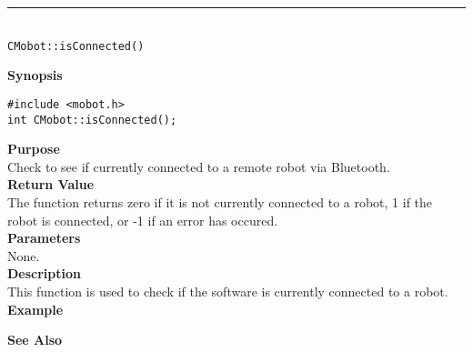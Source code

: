 \noindent
\vspace{5pt}
\rule{4.5in}{0.015in}\\
\noindent
{\LARGE \texttt{CMobot::isConnected()}}\\
{}

\noindent
{\bf Synopsis}
\begin{verbatim}
#include <mobot.h>
int CMobot::isConnected();
\end{verbatim}

\noindent
{\bf Purpose}\\
Check to see if currently connected to a remote robot via Bluetooth.\\

\noindent
{\bf Return Value}\\
The function returns zero if it is not currently connected to a robot, 1 if the robot 
is connected, or -1 if an error has occured.\\

\noindent
{\bf Parameters}\\
None.\\

\noindent
{\bf Description}\\
This function is used to check if the software is currently connected to
a robot.\\

\noindent
{\bf Example}\\
\noindent

\noindent
{\bf See Also}\\

